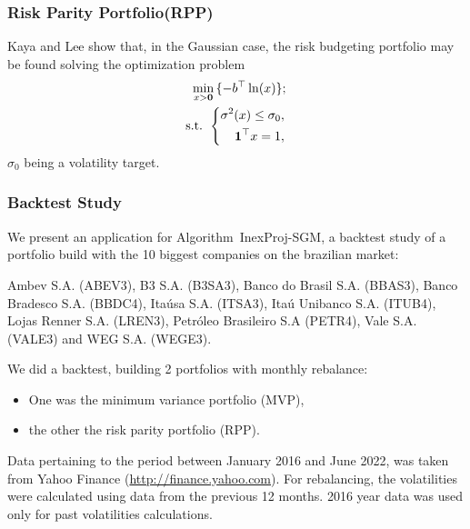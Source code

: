 \begin{frame}[t]\frametitle{Risk Parity Portfolio(RPP)}\bigskip
	Kaya and Lee  show that, in the Gaussian case, the risk budgeting portfolio may be found solving the optimization problem
	\begin{eqnarray}
		\min_{x> \textbf{0}}\, \{-b^\top \ln(x)\}; \label{eq:RPP}\nonumber\\
		\mbox{s.t. }\left\{ 
		\begin{aligned}
			\sigma^2(x)\leq \sigma_0, \\
			{\bf 1}^\top x =1,
		\end{aligned}
		\right.
	\end{eqnarray}
	$\sigma_0$ being a volatility target.
\end{frame}

\begin{frame}[t]\frametitle{Backtest Study}\bigskip
	We present an application for Algorithm~InexProj-SGM, a backtest study of a portfolio build with the 10 biggest companies on the brazilian market:

	Ambev S.A. (ABEV3), B3 S.A. (B3SA3), Banco do Brasil S.A. (BBAS3), Banco Bradesco S.A. (BBDC4), Itaúsa S.A. (ITSA3), Itaú Unibanco S.A. (ITUB4), Lojas Renner S.A. (LREN3), Petróleo Brasileiro S.A (PETR4), Vale S.A. (VALE3) and WEG S.A. (WEGE3).

	We did a backtest, building 2 portfolios with monthly rebalance:
	\begin{itemize}
		\item One was the minimum variance portfolio (MVP),
		\item the other the risk parity portfolio (RPP).
	\end{itemize}

	Data pertaining to the period between January 2016  and June 2022, was taken from Yahoo Finance (\url{http://finance.yahoo.com}). For rebalancing, the volatilities were calculated using data from the previous 12 months. 2016 year data was used only for past volatilities calculations.
\end{frame}

